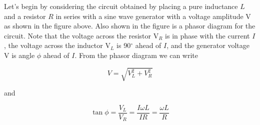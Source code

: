 \vspace{0.3cm}
{\centering {} \par}
\vspace{0.3cm}

Let's begin by considering the circuit obtained by placing a pure
inductance $L$ and a resistor $R$ in series with a sine wave generator
with a voltage amplitude V as shown in the figure above. Also shown
in the figure is a phasor diagram for the circuit. Note that the voltage
across the resistor V\( _{R} \) is in phase with the current $I$, the
voltage across the inductor V\( _{L} \) is 90\( ^{\circ } \) ahead
of $I$, and the generator voltage V is angle \( \phi  \) ahead of $I$.
From the phasor diagram we can write 

\[
V=\sqrt{V_{L}^{2}+V_{R}^{2}}\]


and 

\[
\tan \phi =\frac{V_{L}}{V_{R}}=\frac{I\omega L}{IR}=\frac{\omega L}{R}\]


